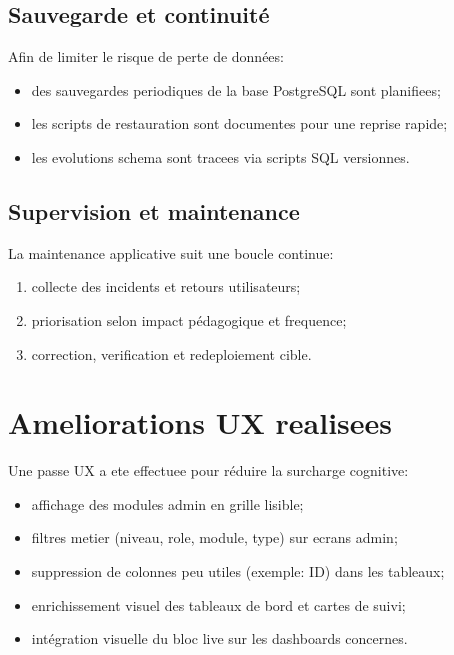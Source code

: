 \documentclass[12pt,a4paper,oneside]{report}
\begin{document}
\subsection{Sauvegarde et continuité}

Afin de limiter le risque de perte de données:
\begin{itemize}
  \item des sauvegardes periodiques de la base PostgreSQL sont planifiees;
  \item les scripts de restauration sont documentes pour une reprise rapide;
  \item les evolutions schema sont tracees via scripts SQL versionnes.
\end{itemize}

\subsection{Supervision et maintenance}

La maintenance applicative suit une boucle continue:
\begin{enumerate}
  \item collecte des incidents et retours utilisateurs;
  \item priorisation selon impact pédagogique et frequence;
  \item correction, verification et redeploiement cible.
\end{enumerate}

\section{Ameliorations UX realisees}

Une passe UX a ete effectuee pour réduire la surcharge cognitive:
\begin{itemize}
  \item affichage des modules admin en grille lisible;
  \item filtres metier (niveau, role, module, type) sur ecrans admin;
  \item suppression de colonnes peu utiles (exemple: ID) dans les tableaux;
  \item enrichissement visuel des tableaux de bord et cartes de suivi;
  \item intégration visuelle du bloc live sur les dashboards concernes.
\end{itemize}
\end{document}
